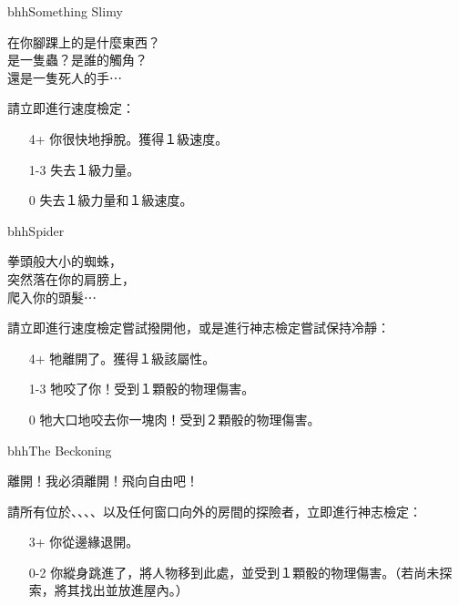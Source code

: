 \linebreak[0]%
\begin{EventCard}{bhh}{Something Slimy}
  \begin{CardStory}
    在你腳踝上的是什麼東西？\\
    是一隻蟲？是誰的觸角？\\
    還是一隻死人的手⋯
  \end{CardStory}
  請立即進行速度檢定：
  \begin{itemize}
    \item[4+] 你很快地掙脫。獲得１級速度。
    \item[1-3] 失去１級力量。
    \item[0] 失去１級力量和１級速度。
  \end{itemize}
\end{EventCard}%
\linebreak[0]%
\begin{EventCard}{bhh}{Spider}
  \begin{CardStory}
    拳頭般大小的蜘蛛，\\
    突然落在你的肩膀上，\\
    爬入你的頭髮⋯
  \end{CardStory}
  請立即進行速度檢定嘗試撥開他，或是進行神志檢定嘗試保持冷靜：
  \begin{itemize}
    \item[4+] 牠離開了。獲得１級該屬性。
    \item[1-3] 牠咬了你！受到１顆骰的物理傷害。
    \item[0] 牠大口地咬去你一塊肉！受到２顆骰的物理傷害。
  \end{itemize}
\end{EventCard}%
\linebreak[0]%
\begin{EventCard}{bhh}{The Beckoning}
  \begin{CardStory}
    離開！我必須離開！飛向自由吧！
  \end{CardStory}
  請所有位於、、、、以及任何窗口向外的房間的探險者，立即進行神志檢定：
  \begin{itemize}
    \item[3+] 你從邊緣退開。
    \item[0-2] 你縱身跳進了，將人物移到此處，並受到１顆骰的物理傷害。（若尚未探索，將其找出並放進屋內。）
  \end{itemize}
\end{EventCard}%
\linebreak[0]%
